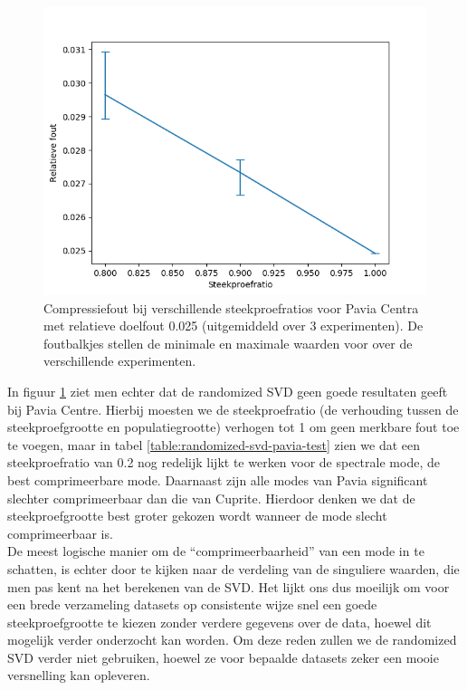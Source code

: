 \begin{figure}[]
  \centering
  \includegraphics[scale=0.8]{images/randomized_svd_pavia_ratios.png}
  \caption{Compressiefout bij verschillende steekproefratios voor Pavia Centra met relatieve doelfout 0.025 (uitgemiddeld over 3 experimenten). De foutbalkjes stellen de minimale en maximale waarden voor over de verschillende experimenten.}
\label{fig:randomized-svd-pavia-ratios}
\end{figure}

In figuur \ref{fig:randomized-svd-pavia-ratios} ziet men echter dat de randomized SVD geen goede resultaten geeft bij Pavia Centre. Hierbij moesten we de steekproefratio (de verhouding tussen de steekproefgrootte en populatiegrootte) verhogen tot 1 om geen merkbare fout toe te voegen, maar in tabel \ref{table:randomized-svd-pavia-test} zien we dat een steekproefratio van 0.2 nog redelijk lijkt te werken voor de spectrale mode, de best comprimeerbare mode. Daarnaast zijn alle modes van Pavia significant slechter comprimeerbaar dan die van Cuprite. Hierdoor denken we dat de steekproefgrootte best groter gekozen wordt wanneer de mode slecht comprimeerbaar is.\\

De meest logische manier om de ``comprimeerbaarheid'' van een mode in te schatten, is echter door te kijken naar de verdeling van de singuliere waarden, die men pas kent na het berekenen van de SVD. Het lijkt ons dus moeilijk om voor een brede verzameling datasets op consistente wijze snel een goede steekproefgrootte te kiezen zonder verdere gegevens over de data, hoewel dit mogelijk verder onderzocht kan worden. Om deze reden zullen we de randomized SVD verder niet gebruiken, hoewel ze voor bepaalde datasets zeker een mooie versnelling kan opleveren.

